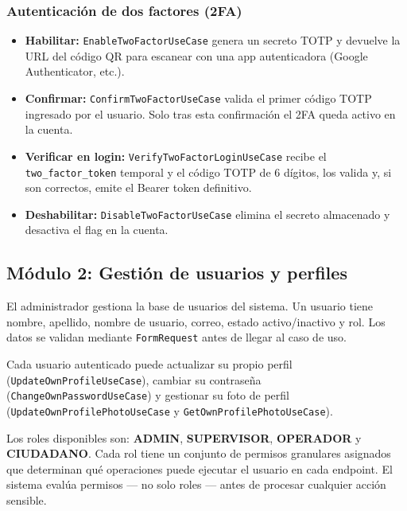 \documentclass[12pt,a4paper]{article}
\begin{document}
\subsubsection*{Autenticación de dos factores (2FA)}

\begin{itemize}
    \item \textbf{Habilitar:} \texttt{EnableTwoFactorUseCase} genera un secreto
          TOTP y devuelve la URL del código QR para escanear con una app
          autenticadora (Google Authenticator, etc.).
    \item \textbf{Confirmar:} \texttt{ConfirmTwoFactorUseCase} valida el primer
          código TOTP ingresado por el usuario. Solo tras esta confirmación el 2FA
          queda activo en la cuenta.
    \item \textbf{Verificar en login:} \texttt{VerifyTwoFactorLoginUseCase} recibe
          el \texttt{two\_factor\_token} temporal y el código TOTP de 6 dígitos,
          los valida y, si son correctos, emite el Bearer token definitivo.
    \item \textbf{Deshabilitar:} \texttt{DisableTwoFactorUseCase} elimina el
          secreto almacenado y desactiva el flag en la cuenta.
\end{itemize}

\subsection{Módulo 2: Gestión de usuarios y perfiles}

El administrador gestiona la base de usuarios del sistema. Un usuario tiene
nombre, apellido, nombre de usuario, correo, estado activo/inactivo y rol.
Los datos se validan mediante \texttt{FormRequest} antes de llegar al caso de uso.

Cada usuario autenticado puede actualizar su propio perfil
(\texttt{UpdateOwnProfileUseCase}), cambiar su contraseña
(\texttt{ChangeOwnPasswordUseCase}) y gestionar su foto de perfil
(\texttt{UpdateOwnProfilePhotoUseCase} y \texttt{GetOwnProfilePhotoUseCase}).

Los roles disponibles son: \textbf{ADMIN}, \textbf{SUPERVISOR}, \textbf{OPERADOR}
y \textbf{CIUDADANO}. Cada rol tiene un conjunto de permisos granulares asignados
que determinan qué operaciones puede ejecutar el usuario en cada endpoint. El
sistema evalúa permisos --- no solo roles --- antes de procesar cualquier acción
sensible.
\end{document}
